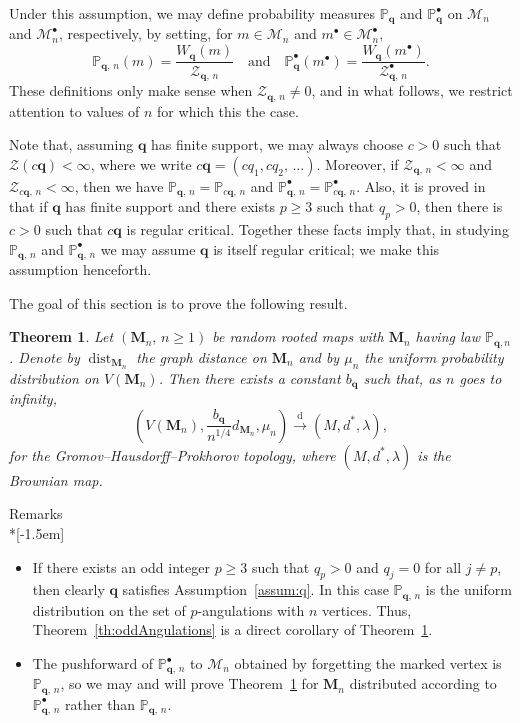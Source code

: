 \documentclass[10pt]{amsart}
\newtheorem{theo}{Theorem}[section]
\theoremstyle{definition}\newtheorem{defi}[theo]{Definition}\newtheorem{rema}[theo]{Remark}\newtheorem{exam}[theo]{Example}\newtheorem{exem}[theo]{Example}\newtheorem{nota}[theo]{Notation}
\newcommand{\bbP}{\mathbb{P}}
\newcommand{\bfq}{\mathbf{q}}
\newcommand{\cM}{\mathcal{M}}
\newcommand{\cZ}{\mathcal{Z}}
\newcommand{\bM}{\mathbf{M}}
\DeclareMathOperator{\dist}{dist}
\newcommand{\sbt}{{\ensuremath{\scriptscriptstyle\bullet}}}
\newcommand{\convdist}{\ensuremath{\stackrel{\mathrm{d}}{\rightarrow}}}
\begin{document}
Under this assumption, we may define probability measures $\bbP_{\bfq}$ and $\bbP^\bullet_{\bfq}$ on $\cM_n$ and $\cM_n^\bullet$, respectively, by setting, for $m\in \cM_n$ and $m^\sbt \in \cM_n^\sbt$,
\[
\bbP_{\bfq,\,n}(m) = \frac{W_{\bfq}(m)}{\cZ_{\bfq,\,n}}\quad \text{and}\quad\bbP^\bullet_{\bfq}(m^\sbt) = \frac{W_{\bfq}(m^\sbt)}{\cZ^\sbt_{\bfq,\,n}}.
\]
These definitions only make sense when $\cZ_{\bfq,\,n}\neq 0$, and in what follows, we restrict attention to values of $n$ for which this the case.


Note that, assuming $\bfq$ has finite support, we may always choose $c > 0$ such that $\cZ(c\bfq)<\infty$, where we write $c\bfq=(cq_1,cq_2,\,\ldots)$. Moreover, if $\cZ_{\bfq,\,n}< \infty$ and $\cZ_{c\bfq,\,n}<\infty$, then we have $\bbP_{\bfq,\,n}=\bbP_{c\bfq,\,n}$ and $\bbP_{\bfq,\,n}^\sbt=\bbP_{c\bfq,\,n}^\sbt$. Also, it is proved in~\cite[the Appendix]{CurienLeGallMiermontCactus} that if $\bfq$ has finite support and there exists $p\geq 3$ such that $q_p>0$, then there is $c>0$ such that $c\bfq$ is regular critical. Together these facts imply that, in studying $\bbP_{\bfq,\,n}$ and $\bbP_{\bfq,\,n}^\sbt$ we may assume $\bfq$ is itself regular critical; we make this assumption henceforth.

The goal of this section is to prove the following result.


\begin{theo}\label{th:convergence}
Let $(\bM_n,\,n \ge 1)$ be random rooted maps with $\bM_n$ having law $\bbP_{\bfq,n}$. Denote by $\dist_{\bM_n}$ the graph distance on $\bM_n$ and by $\mu_n$ the uniform probability distribution on $V(\bM_n)$. Then there exists a constant $b_\bfq$ such that, as $n$ goes to infinity,
\[
\left(V(\bM_n),\frac{b_{\bfq}}{n^{1/4}}d_{\bM_n},\mu_n\right) \convdist (M,d^*,\lambda),
\]
for the Gromov--Hausdorff--Prokhorov topology, where $(M,d^*,\lambda)$ is the Brownian map.
\end{theo}


\begin{enonce*}[plain]{Remarks}\ \\*[-1.5em]
\begin{itemize} 
 \item[$\star$] If there exists an odd integer $p\geq 3$ such that $q_p > 0 $ and $q_j = 0$ for all $j\neq p$, then clearly $\bfq$ satisfies Assumption~\ref{assum:q}. In this case $\bbP_{\bfq,\,n}$ is the uniform distribution on the set of $p$-angulations with $n$ vertices. Thus, Theorem~\ref{th:oddAngulations} is a direct corollary of Theorem~\ref{th:convergence}.
\item[$\star$] The pushforward of $\bbP^\bullet_{\bfq,\,n}$ to $\cM_n$ obtained by forgetting the marked vertex is $\bbP_{\bfq,\,n}$, so we may and will prove Theorem~\ref{th:convergence} for $\bM_n$ distributed according to $\bbP^\bullet_{\bfq,\,n}$ rather than $\bbP_{\bfq,\,n}$.
\end{itemize}
\end{enonce*}
\end{document}
